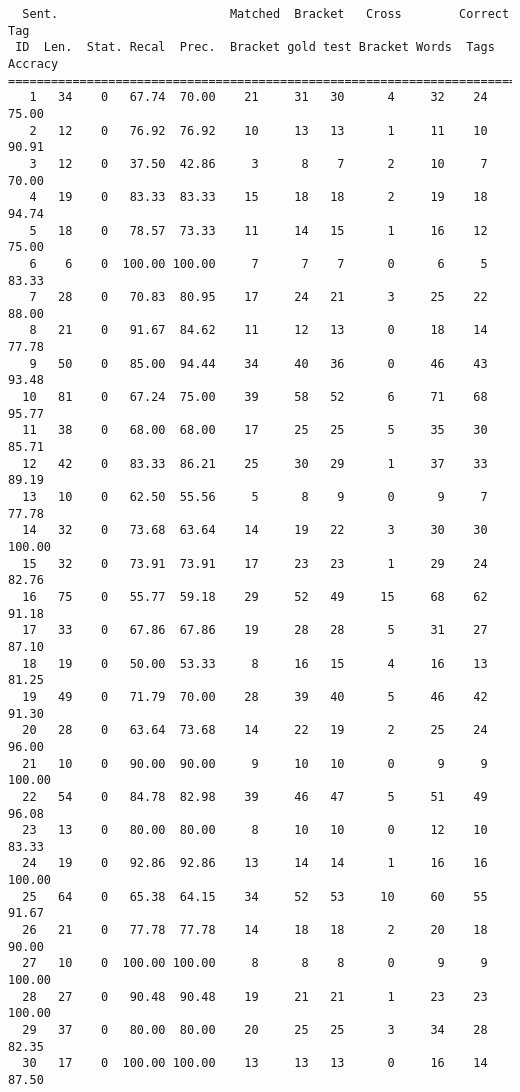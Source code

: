 \scriptsize
\begin{verbatim}
  Sent.                        Matched  Bracket   Cross        Correct Tag
 ID  Len.  Stat. Recal  Prec.  Bracket gold test Bracket Words  Tags Accracy
============================================================================
   1   34    0   67.74  70.00    21     31   30      4     32    24    75.00
   2   12    0   76.92  76.92    10     13   13      1     11    10    90.91
   3   12    0   37.50  42.86     3      8    7      2     10     7    70.00
   4   19    0   83.33  83.33    15     18   18      2     19    18    94.74
   5   18    0   78.57  73.33    11     14   15      1     16    12    75.00
   6    6    0  100.00 100.00     7      7    7      0      6     5    83.33
   7   28    0   70.83  80.95    17     24   21      3     25    22    88.00
   8   21    0   91.67  84.62    11     12   13      0     18    14    77.78
   9   50    0   85.00  94.44    34     40   36      0     46    43    93.48
  10   81    0   67.24  75.00    39     58   52      6     71    68    95.77
  11   38    0   68.00  68.00    17     25   25      5     35    30    85.71
  12   42    0   83.33  86.21    25     30   29      1     37    33    89.19
  13   10    0   62.50  55.56     5      8    9      0      9     7    77.78
  14   32    0   73.68  63.64    14     19   22      3     30    30   100.00
  15   32    0   73.91  73.91    17     23   23      1     29    24    82.76
  16   75    0   55.77  59.18    29     52   49     15     68    62    91.18
  17   33    0   67.86  67.86    19     28   28      5     31    27    87.10
  18   19    0   50.00  53.33     8     16   15      4     16    13    81.25
  19   49    0   71.79  70.00    28     39   40      5     46    42    91.30
  20   28    0   63.64  73.68    14     22   19      2     25    24    96.00
  21   10    0   90.00  90.00     9     10   10      0      9     9   100.00
  22   54    0   84.78  82.98    39     46   47      5     51    49    96.08
  23   13    0   80.00  80.00     8     10   10      0     12    10    83.33
  24   19    0   92.86  92.86    13     14   14      1     16    16   100.00
  25   64    0   65.38  64.15    34     52   53     10     60    55    91.67
  26   21    0   77.78  77.78    14     18   18      2     20    18    90.00
  27   10    0  100.00 100.00     8      8    8      0      9     9   100.00
  28   27    0   90.48  90.48    19     21   21      1     23    23   100.00
  29   37    0   80.00  80.00    20     25   25      3     34    28    82.35
  30   17    0  100.00 100.00    13     13   13      0     16    14    87.50

\end{verbatim}
